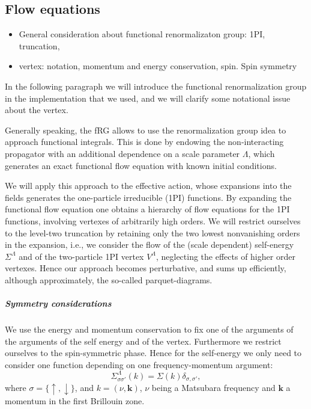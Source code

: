 \subsection{Flow equations}

\begin{itemize} 
\item General consideration about functional renormalizaton group: 1PI, truncation, 
\item vertex: notation, momentum and energy conservation, spin. Spin symmetry 

\end{itemize}

In the following paragraph we will introduce the functional renormalization group in the implementation that we used, and we will clarify some notational issue about the vertex. 

Generally speaking, the fRG allows to use the renormalization group idea to approach functional integrals. 
This is done by endowing the non-interacting propagator with an additional dependence on a scale parameter $\Lambda$, which generates an exact functional flow equation with known initial conditions. 

We will apply this approach to the effective action, whose expansions into the fields generates the one-particle irreducible (1PI)  functions. By expanding the functional flow equation one obtains a hierarchy of flow equations for the 1PI functions, involving vertexes of arbitrarily  high orders. 
We will restrict ourselves to the level-two truncation by retaining only the two lowest nonvanishing orders in the expansion, i.e., we consider the flow of the (scale dependent) self-energy $\Sigma^\Lambda$ and of the two-particle 1PI vertex $V^\Lambda$, neglecting the effects of higher order vertexes. 
Hence our approach becomes perturbative, and sums up efficiently, although approximately, the so-called parquet-diagrams. 

\subparagraph*{Symmetry considerations} We use the energy and momentum conservation to fix one of the arguments of the arguments of the self energy and of the vertex. 
Furthermore we restrict ourselves to the spin-symmetric phase. 
Hence for the self-energy  we only need to consider one function depending on one frequency-momentum argument: 
\begin{equation}
\Sigma^\Lambda_{\sigma\sigma'}(k)=\Sigma(k)\delta_{\sigma,\sigma'}, 
\end{equation}
where $\sigma = \{\uparrow, \downarrow\} $, and $k=(\nu,\mathbf{k})$, $\nu$ being a Matsubara frequency and $\mathbf{k}$ a momentum in the first Brillouin zone. 

